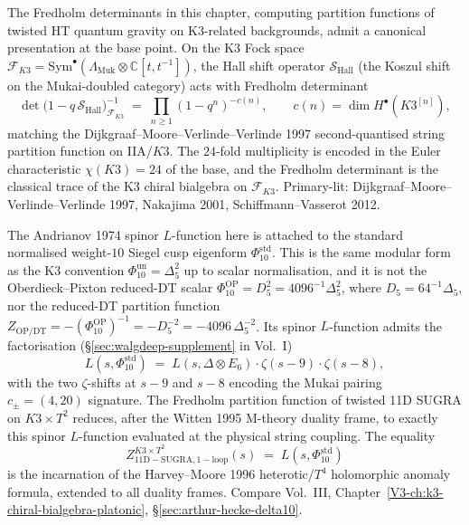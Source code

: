 \begin{remark}
\label{rem:fredholm-pf-1}
The Fredholm determinants in this chapter, computing partition functions
of twisted HT quantum gravity on K3-related backgrounds, admit a
canonical presentation at the base point. On the K3 Fock space
$\mathcal F_{K3} = \mathrm{Sym}^\bullet(\Lambda_{\mathrm{Muk}}\otimes\mathbb C[t,t^{-1}])$,
the Hall shift operator $\mathcal S_{\mathrm{Hall}}$ (the Koszul
shift on the Mukai-doubled category) acts with Fredholm determinant
\[
\det\!\bigl(1 - q\, \mathcal S_{\mathrm{Hall}}\bigr)^{-1}_{\mathcal F_{K3}} \;=\; \prod_{n\ge 1} (1 - q^n)^{-c(n)},
\qquad c(n) = \dim H^\bullet(K3^{[n]}),
\]
matching the Dijkgraaf--Moore--Verlinde--Verlinde 1997 second-quantised
string partition function on IIA/$K3$. The $24$-fold multiplicity is
encoded in the Euler characteristic $\chi(K3) = 24$ of the base, and
the Fredholm determinant is the classical trace of the K3 chiral
bialgebra on $\mathcal F_{K3}$. Primary-lit: Dijkgraaf--Moore--Verlinde--Verlinde
1997, Nakajima 2001, Schiffmann--Vasserot 2012.
\end{remark}

\begin{remark}
\label{rem:fredholm-pf-2}
The Andrianov 1974 spinor $L$-function here is attached to the
standard normalised weight-$10$ Siegel cusp eigenform
\(\Phi_{10}^{\mathrm{std}}\).  This is the same modular form as the
K3 convention \(\Phi_{10}^{\mathrm{un}}=\Delta_5^2\) up to scalar
normalisation, and it is not the Oberdieck--Pixton reduced-DT scalar
\(\Phi_{10}^{\mathrm{OP}}=D_5^2=4096^{-1}\Delta_5^2\), where
\(D_5=64^{-1}\Delta_5\), nor the reduced-DT partition function
\(Z_{\mathrm{OP/DT}}=-(\Phi_{10}^{\mathrm{OP}})^{-1}
=-D_5^{-2}=-4096\,\Delta_5^{-2}\).  Its spinor \(L\)-function admits the
factorisation (\S\ref{sec:walgdeep-supplement} in Vol.~I)
\[
L(s, \Phi_{10}^{\mathrm{std}})
\;=\; L(s, \Delta\otimes E_6)\cdot \zeta(s-9)\cdot \zeta(s-8),
\]
with the two $\zeta$-shifts at $s-9$ and $s-8$ encoding the Mukai
pairing $c_\pm = (4,20)$ signature. The Fredholm partition function of
twisted 11D SUGRA on $K3\times T^2$ reduces, after the Witten 1995 M-theory
duality frame, to exactly this spinor $L$-function evaluated at the
physical string coupling. The equality
\[
Z_{\mathrm{11D-SUGRA,1-loop}}^{K3\times T^2}(s)
\;=\; L(s, \Phi_{10}^{\mathrm{std}})
\]
is the incarnation of the Harvey--Moore 1996 heterotic/$T^4$
holomorphic anomaly formula, extended to all duality frames. Compare
Vol.~III, Chapter~\ref{V3-ch:k3-chiral-bialgebra-platonic},
\S\ref{sec:arthur-hecke-delta10}.
\end{remark}
